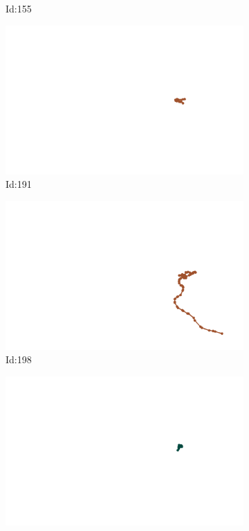 \documentclass[12pt,twoside]{report}
\begin{document}
\begin{figure}
\begin{subfigure}[b]{0.20\textwidth}
\caption{Id:155}
\end{subfigure}
\begin{subfigure}[b]{0.20\textwidth}
\centering
\includegraphics[width=\textwidth]{../trajectories/191.png}
\caption{Id:191}
\end{subfigure}
\begin{subfigure}[b]{0.20\textwidth}
\centering
\includegraphics[width=\textwidth]{../trajectories/198.png}
\caption{Id:198}
\end{subfigure}
\begin{subfigure}[b]{0.20\textwidth}
\centering
\includegraphics[width=\textwidth]{../trajectories/220.png}

\end{subfigure}
\end{figure}
\end{document}
